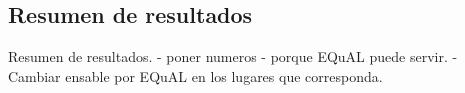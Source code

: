 \subsection{Resumen de resultados}

Resumen de resultados.
- poner numeros
- porque EQuAL puede servir.
- Cambiar ensable por EQuAL en los lugares que corresponda.